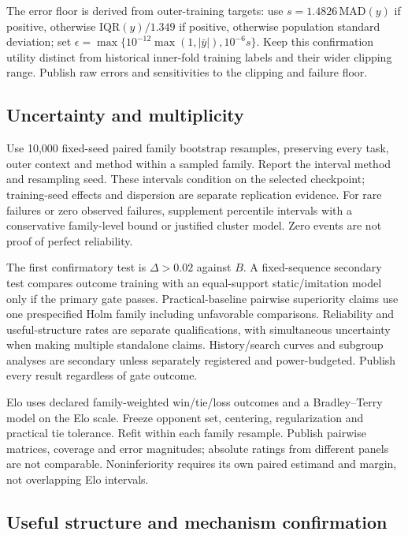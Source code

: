 The error floor is derived from outer-training targets: use
$s=1.4826\,\mathrm{MAD}(y)$ if positive, otherwise
$\mathrm{IQR}(y)/1.349$ if positive, otherwise population standard deviation;
set $\epsilon=\max\{10^{-12}\max(1,|\bar y|),10^{-6}s\}$.
Keep this confirmation utility distinct from historical inner-fold training
labels and their wider clipping range. Publish raw errors and sensitivities to
the clipping and failure floor.

\subsection{Uncertainty and multiplicity}

Use 10,000 fixed-seed paired family bootstrap resamples, preserving every task,
outer context and method within a sampled family. Report the interval method
and resampling seed. These intervals condition on the selected checkpoint;
training-seed effects and dispersion are separate replication evidence. For rare
failures or zero observed failures, supplement percentile intervals with a
conservative family-level bound or justified cluster model. Zero events are not
proof of perfect reliability.

The first confirmatory test is $\Delta>0.02$ against $B$. A fixed-sequence
secondary test compares outcome training with an equal-support static/imitation
model only if the primary gate passes. Practical-baseline pairwise superiority
claims use one prespecified Holm family including unfavorable comparisons.
Reliability and useful-structure rates are separate qualifications, with
simultaneous uncertainty when making multiple standalone claims. History/search
curves and subgroup analyses are secondary unless separately registered and
power-budgeted. Publish every result regardless of gate outcome.

Elo uses declared family-weighted win/tie/loss outcomes and a Bradley--Terry
model on the Elo scale. Freeze opponent set, centering, regularization and
practical tie tolerance. Refit within each family resample. Publish pairwise
matrices, coverage and error magnitudes; absolute ratings from different panels
are not comparable. Noninferiority requires its own paired estimand and margin,
not overlapping Elo intervals.

\subsection{Useful structure and mechanism confirmation}

